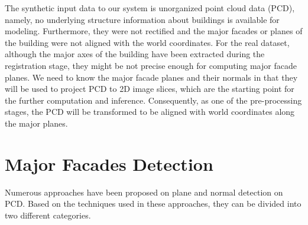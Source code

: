 The synthetic input data to our system
is unorganized point cloud data (PCD),
namely, no underlying structure information about buildings
is available for modeling.
Furthermore, they were not rectified and
the major facades or planes of the building
were not aligned with the world coordinates.
For the real dataset, although the major axes of the building
have been extracted during the registration stage,
they might be not precise enough for computing major facade planes.
We need to know the major facade planes and their normals in that
they will be used to project PCD to 2D image slices,
which are the starting point for the further computation and inference.
Consequently, as one of the pre-processing stages, the PCD will be transformed
to be aligned with world coordinates along the major planes.

\section{Major Facades Detection}

%
%

Numerous approaches have been proposed on plane and normal detection on PCD.
Based on the techniques used in these approaches,
they can be divided into two different categories.

